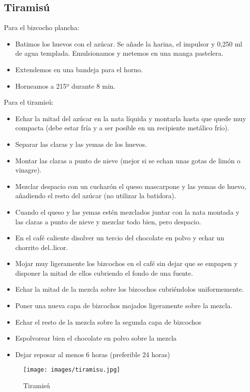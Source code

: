 \subsection{Tiramisú}
\label{sec:tiramisu}

Para el bizcocho plancha:

\begin{itemize}
\item Batimos los huevos con el azúcar. Se añade la harina, el impulsor y 0,250  ml de agua templada. Emulsionamos y metemos en una manga pastelera. 
\item Extendemos en una bandeja para el horno. 
\item Horneamos a 215º durante 8 min.
\end{itemize}
Para el tiramisú:
\begin{itemize}
\item Echar la mitad del azúcar en la nata líquida y montarla hasta que quede muy compacta (debe estar fría y a ser posible en un recipiente metálico frío).
\item Separar las claras y las yemas de los huevos.
\item Montar las claras a punto de nieve (mejor si se echan unas gotas de limón o vinagre).
\item Mezclar despacio con un cucharón el queso mascarpone y las yemas de huevo, añadiendo el resto del azúcar (no utilizar la batidora).
\item Cuando el queso y las yemas estén mezclados juntar con la nata montada y las claras a punto de nieve y mezclar todo bien, pero despacio.
\item En el café caliente disolver un tercio del chocolate en polvo y echar un chorrito del..licor.
\item Mojar muy ligeramente los bizcochos en el café sin dejar que se empapen y disponer la mitad de ellos cubriendo el fondo de una fuente.
\item Echar la mitad de la mezcla sobre los bizcochos cubriéndolos uniformemente.
\item Poner una nueva capa de bizcochos mojados ligeramente sobre la mezcla.
\item Echar el resto de la mezcla sobre la segunda capa de bizcochos
\item Espolvorear bien el chocolate en polvo sobre la mezcla
\item Dejar reposar al menos 6 horas (preferible 24 horas)
\end{itemize}

\begin{figure}[h]
  \begin{center}
    \texttt{[image: images/tiramisu.jpg]}
    \caption{Tiramisú}
    \label{fig:tiramisu}
  \end{center}
\end{figure}

